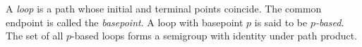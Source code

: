 A \textit{loop} is a path whose initial and terminal points coincide. The common endpoint is called the \textit{basepoint}. A loop with basepoint $p$ is said to be \textit{$p$-based}. The set of all $p$-based loops forms a semigroup with identity under path product.
